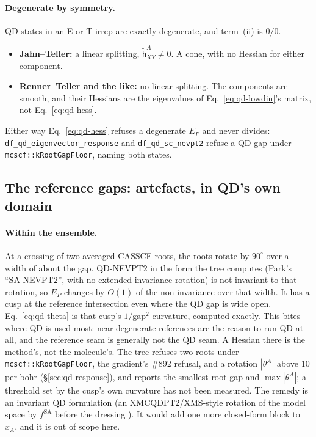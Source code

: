 \documentclass[11pt]{article}
\newcommand{\code}[1]{\texttt{#1}}
\begin{document}
\paragraph{Degenerate by symmetry.} QD states in an E or T irrep are
exactly degenerate, and term~(ii) is $0/0$.
\begin{itemize}
\item \textbf{Jahn--Teller:} a linear splitting, $\tilde{\mathsf h}^A_{XY}
  \neq 0$. A cone, with no Hessian for either component.
\item \textbf{Renner--Teller and the like:} no linear splitting. The
  components are smooth, and their Hessians are the eigenvalues of
  Eq.~\eqref{eq:qd-lowdin}'s matrix, not Eq.~\eqref{eq:qd-hess}.
\end{itemize}
Either way Eq.~\eqref{eq:qd-hess} refuses a degenerate $E_P$ and never
divides: \code{df\_qd\_eigenvector\_response} and
\code{df\_qd\_sc\_nevpt2} refuse a QD gap under
\code{mcscf::kRootGapFloor}, naming both states.

\subsection{The reference gaps: artefacts, in QD's own domain}

\paragraph{Within the ensemble.} At a crossing of two averaged CASSCF
roots, the roots rotate by $90^\circ$ over a width of about the gap.
QD-NEVPT2 in the form the tree computes (Park's ``SA-NEVPT2'', with no
extended-invariance rotation) is not invariant to that rotation, so $E_P$
changes by $O(1)$ of the non-invariance over that width. It has a cusp at
the reference intersection even where the QD gap is wide open.
Eq.~\eqref{eq:qd-theta} is that cusp's $1/\text{gap}^2$ curvature, computed
exactly. This bites where QD is used most: near-degenerate references are
the reason to run QD at all, and the reference seam is generally not the QD
seam. A Hessian there is the method's, not the molecule's. The tree refuses
two roots under \code{mcscf::kRootGapFloor}, the gradient's \#892 refusal,
and a rotation $|\theta^A|$ above 10 per bohr (\S\ref{sec:qd-response}),
and reports the smallest root gap and $\max|\theta^A|$; a threshold set by
the cusp's own curvature has not been measured. The remedy is an invariant
QD formulation (an XMCQDPT2/XMS-style rotation of the model space by
$f^{\mathrm{SA}}$ before the dressing \cite{granovsky2011}). It would add
one more closed-form block to $x_A$, and it is out of scope here.
\end{document}
